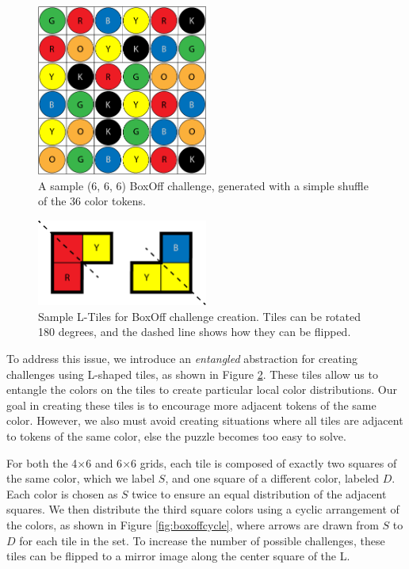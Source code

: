 \documentclass[journal]{IEEEtran}
\begin{document}
\begin{figure}[t]
\centering
\includegraphics[width=5.6cm]{boxoff666basic1.png}
\caption{A sample (6, 6, 6) BoxOff challenge, generated with a simple shuffle of the 36 color tokens. }
\label{fig:boxoff666}
\end{figure}


\begin{figure}[t]
\centering
\includegraphics[width=5.6cm]{boxofftiles1.png}
\caption{Sample L-Tiles for BoxOff challenge creation. Tiles can be rotated 180 degrees, and the dashed line shows how they can be flipped. }
\label{fig:ltiles}
\end{figure}

To address this issue, we introduce an {\it entangled} abstraction for creating challenges using L-shaped tiles, as shown in Figure \ref{fig:ltiles}. These tiles allow us to entangle the colors on the tiles to create particular local color distributions.
Our goal in creating these tiles is to encourage more adjacent tokens of the same color. However, we also must avoid creating situations where all tiles are adjacent to tokens of the same color, else the puzzle becomes too easy to solve. 

For both the 4$\times$6 and 6$\times$6 grids, each tile is composed of exactly two squares of the same color, which we label $S$, and one square of a different color, labeled $D$. Each color is chosen as $S$ twice to ensure an equal distribution of the adjacent squares. We then distribute the third square colors using a cyclic arrangement of the colors, as shown in Figure \ref{fig:boxoffcycle}, where arrows are drawn from $S$ to $D$ for each tile in the set.  To increase the number of possible challenges, these tiles can be flipped to a mirror image along the center square of the L.
\end{document}
